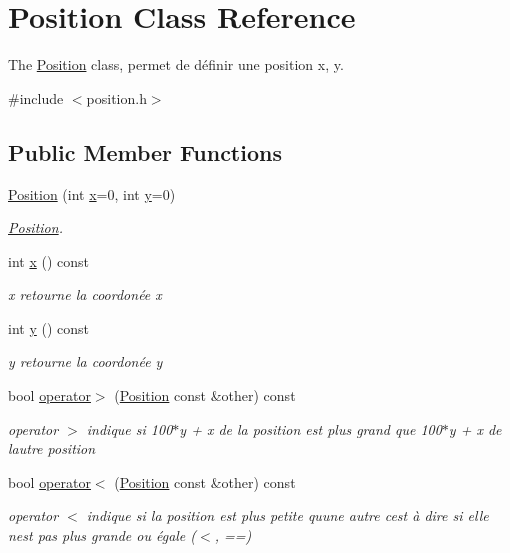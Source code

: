 \hypertarget{class_position}{}\section{Position Class Reference}
\label{class_position}


The \mbox{\hyperlink{class_position}{Position}} class, permet de définir une position x, y.  




{\ttfamily \#include $<$position.\+h$>$}

\subsection*{Public Member Functions}
\begin{DoxyCompactItemize}
\item 
\mbox{\hyperlink{class_position_aefa590074d28918732e477cf447d16b8}{Position}} (int \mbox{\hyperlink{class_position_a085247752073466c9f5966c90a32a790}{x}}=0, int \mbox{\hyperlink{class_position_aca40f7c92b1c799d5add662bf2c5cc11}{y}}=0)
\begin{DoxyCompactList}\small\item\em \mbox{\hyperlink{class_position}{Position}}. \end{DoxyCompactList}\item 
int \mbox{\hyperlink{class_position_a085247752073466c9f5966c90a32a790}{x}} () const
\begin{DoxyCompactList}\small\item\em x retourne la coordonée x \end{DoxyCompactList}\item 
int \mbox{\hyperlink{class_position_aca40f7c92b1c799d5add662bf2c5cc11}{y}} () const
\begin{DoxyCompactList}\small\item\em y retourne la coordonée y \end{DoxyCompactList}\item 
bool \mbox{\hyperlink{class_position_a4ac05a6dc928c47019dff3b5c9eb8e86}{operator$>$}} (\mbox{\hyperlink{class_position}{Position}} const \&other) const
\begin{DoxyCompactList}\small\item\em operator $>$ indique si 100$\ast$y + x de la position est plus grand que 100$\ast$y + x de l\textquotesingle{}autre position \end{DoxyCompactList}\item 
bool \mbox{\hyperlink{class_position_a7b6d74a3e3de3cd9f689e82df0fccfd7}{operator$<$}} (\mbox{\hyperlink{class_position}{Position}} const \&other) const
\begin{DoxyCompactList}\small\item\em operator $<$ indique si la position est plus petite qu\textquotesingle{}une autre c\textquotesingle{}est à dire si elle n\textquotesingle{}est pas plus grande ou égale ($<$, ==) \end{DoxyCompactList}\end{DoxyCompactItemize}
